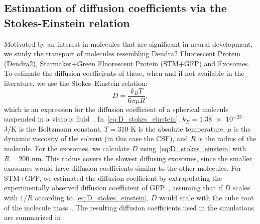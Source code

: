 \documentclass[fleqn]{wlscirep}
\begin{document}
\subsection*{Estimation of diffusion coefficients via the Stokes-Einstein relation}
Motivated by an interest in molecules that are significant in neural development, we study the transport of molecules resembling Dendra2 Fluorescent Protein (Dendra2), Starmaker+Green Fluorescent Protein (STM+GFP) and Exosomes.
To estimate the diffusion coefficients of these, when and if not available in the literature, we use the Stokes--Einstein relation:
\begin{equation}
    D = \frac{k_B T}{6\pi \mu R},
    \label{eq:D_stokes_einstein}
\end{equation}
which is an expression for the diffusion coefficient of a spherical molecule suspended in a viscous fluid~\cite{Einstein1905UberTeilchen}.
In~\eqref{eq:D_stokes_einstein}, $k_B = \num{1.38e-23}$ J/K is the Boltzmann constant, $T = 310$ K is the absolute temperature, $\mu$ is the dynamic viscosity of the solvent (in this case the CSF), and $R$ is the radius of the molecule.
For the exosomes, we calculate $D$ using~\eqref{eq:D_stokes_einstein} with $R=200$ nm. This radius covers the slowest diffusing exosomes, since the smaller exosomes would have diffusion coefficients similar to the other molecules.
For STM+GFP, we estimated the diffusion coefficient by extrapolating the experimentally observed diffusion coefficient of GFP~\cite{Swaminathan1997PhotobleachingDiffusion, Potma2001ReducedCells},
assuming that if $D$ scales with $1/R$ according to~\eqref{eq:D_stokes_einstein}, $D$ would scale with the cube root of the molecule mass~\cite{Goodhill1997DiffusionGuidance}.
The resulting diffusion coefficients used in the simulations are summarized in .

\end{document}
